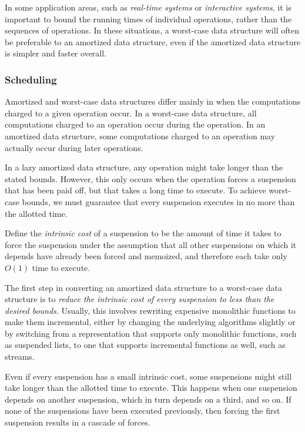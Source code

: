 \documentclass[12pt, a4paper]{article} %
\begin{document}
In some application areas, such as \textit{real-time systems} or \textit{interactive systems}, it is important to bound the running times of individual operations, rather than the sequences of operations. In these situations, a worst-case data structure will often be preferable to an amortized data structure, even if the amortized data structure is simpler and faster overall.

\subsubsection{Scheduling}%
\label{ssub:Scheduling}

Amortized and worst-case data structures differ mainly in when the computations charged to a given operation occur. In a worst-case data structure, all computations charged to an operation occur during the operation. In an amortized data structure, some computations charged to an operation may actually occur during later operations.

In a lazy amortized data structure, any operation might take longer than the stated bounds. However, this only occurs when the operation forces a suspension that has been paid off, but that takes a long time to execute. To achieve worst-case bounds, we must guarantee that every suspension executes in no more than the allotted time.

Define the \textit{intrinsic cost} of a suspension to be the amount of time it takes to force the suspension under the assumption that all other suspensions on which it depends have already been forced and memoized, and therefore each take only $O(1)$ time to execute.

The first step in converting an amortized data structure to a worst-case data structure is to \textit{reduce the intrinsic cost of every suspension to less than the desired bounds}. Usually, this involves rewriting expensive monolithic functions to make them incremental, either by changing the underlying algorithms slightly or by switching from a representation that supports only monolithic functions, such as suspended lists, to one that supports incremental functions as well, such as streams.

Even if every suspension has a small intrinsic cost, some suspensions might still take longer than the allotted time to execute. This happens when one suspension depends on another suspension, which in turn depends on a third, and so on. If none of the suspensions have been executed previously, then forcing the first suspension results in a cascade of forces.
\end{document}
